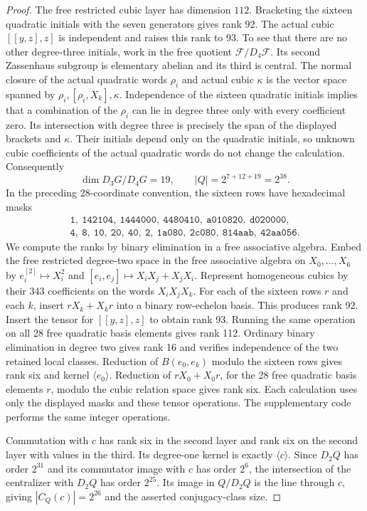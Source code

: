\begin{proof}
The free restricted cubic layer has dimension $112$. Bracketing the
sixteen quadratic initials with the seven generators gives rank $92$.
The actual cubic $[[y,z],z]$ is independent and raises this rank to
$93$. To see that there are no other degree-three initials, work in the free quotient
$\mathcal F/D_4\mathcal F$. Its second Zassenhaus subgroup is elementary
abelian and its third is central. The normal closure of the actual
quadratic words $\rho_i$ and actual cubic $\kappa$ is the vector space
spanned by $\rho_i,[\rho_i,X_k],\kappa$. Independence of the sixteen
quadratic initials implies that a combination of the $\rho_i$ can lie in
degree three only with every coefficient zero. Its intersection with
degree three is precisely the span of the displayed brackets
and $\kappa$. Their initials depend only on the quadratic initials, so
unknown cubic coefficients of the actual quadratic words do not change
the calculation. Consequently
\[
 \dim D_3G/D_4G=19,\qquad |Q|=2^{7+12+19}=2^{38}.
\]
In the preceding 28-coordinate convention, the sixteen rows have
hexadecimal masks
\[
\begin{gathered}
\texttt{1},\ \texttt{142104},\ \texttt{1444000},\ \texttt{4480410},\
\texttt{a010820},\ \texttt{d020000},\\
\texttt{4},\ \texttt{8},\ \texttt{10},\ \texttt{20},\ \texttt{40},\
\texttt{2},\ \texttt{1a080},\ \texttt{2c080},\
\texttt{814aab},\ \texttt{42aa056}.
\end{gathered}
\]
We compute the ranks by binary elimination in a free associative algebra.
Embed the free restricted degree-two space in the free associative algebra
on $X_0,\ldots,X_6$ by
$e_i^{[2]}\mapsto X_i^2$ and
$[e_i,e_j]\mapsto X_iX_j+X_jX_i$.
Represent homogeneous cubics by their 343 coefficients on the words
$X_iX_jX_k$. For each of the sixteen rows $r$ and each $k$, insert
$rX_k+X_kr$ into a binary row-echelon basis. This produces rank 92.
Insert the tensor for $[[y,z],z]$ to obtain rank 93.
Running the same operation on all 28 free quadratic basis elements gives
rank 112. Ordinary binary elimination in degree two gives rank 16 and
verifies independence of the two retained local classes. Reduction of
$B(e_0,e_k)$ modulo the sixteen rows gives rank six and kernel
$\langle e_0\rangle$. Reduction of $rX_0+X_0r$, for the 28 free quadratic
basis elements $r$, modulo the cubic relation space gives rank six.
Each calculation uses only the displayed masks and these tensor
operations. The supplementary code performs the same integer operations.

Commutation with $c$ has rank six in the second layer and rank six on
the second layer with values in the third. Its degree-one kernel is
exactly $\langle c\rangle$. Since $D_2Q$ has order $2^{31}$ and its
commutator image with $c$ has order $2^6$, the intersection of the
centralizer with $D_2Q$ has order $2^{25}$. Its image in $Q/D_2Q$ is
the line through $c$, giving $|C_Q(c)|=2^{26}$ and the asserted
conjugacy-class size.
\end{proof}

